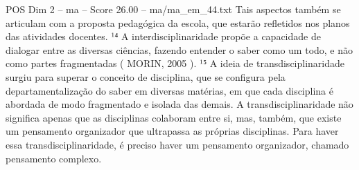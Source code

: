 \begin{textsample}{POS Dim 2 – ma – Score 26.00 – ma/ma\_em\_44.txt}
Tais aspectos também se articulam com a proposta pedagógica da escola, que estarão refletidos nos planos das atividades docentes. ¹⁴ A interdisciplinaridade propõe a capacidade de dialogar entre as diversas ciências, fazendo entender o saber como um todo, e não como partes fragmentadas ( MORIN, 2005 ). ¹⁵ A ideia de transdisciplinaridade surgiu para superar o conceito de disciplina, que se configura pela departamentalização do saber em diversas matérias, em que cada disciplina é abordada de modo fragmentado e isolada das demais.
A transdisciplinaridade não significa apenas que as disciplinas colaboram entre si, mas, também, que existe um pensamento organizador que ultrapassa as próprias disciplinas.
Para haver essa transdisciplinaridade, é preciso haver um pensamento organizador, chamado pensamento complexo.

\end{textsample}
